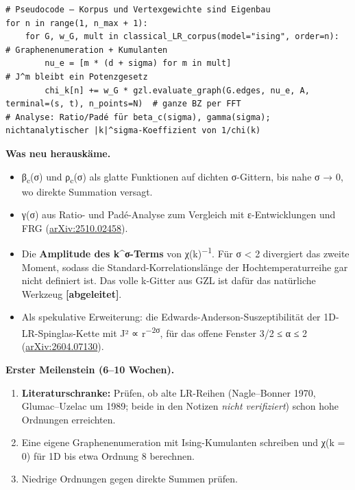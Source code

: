 \begin{verbatim}
# Pseudocode – Korpus und Vertexgewichte sind Eigenbau
for n in range(1, n_max + 1):
    for G, w_G, mult in classical_LR_corpus(model="ising", order=n):   # Graphenenumeration + Kumulanten
        nu_e = [m * (d + sigma) for m in mult]                           # J^m bleibt ein Potenzgesetz
        chi_k[n] += w_G * gzl.evaluate_graph(G.edges, nu_e, A, terminal=(s, t), n_points=N)  # ganze BZ per FFT
# Analyse: Ratio/Padé für beta_c(sigma), gamma(sigma); nichtanalytischer |k|^sigma-Koeffizient von 1/chi(k)
\end{verbatim}

\textbf{Was neu herauskäme.}

\begin{itemize}
\tightlist
\item
  β\textsubscript{c}(σ) und ρ\textsubscript{c}(σ) als glatte Funktionen auf dichten σ-Gittern, bis nahe σ → 0, wo direkte Summation versagt.
\item
  γ(σ) aus Ratio- und Padé-Analyse zum Vergleich mit ε-Entwicklungen und FRG (\href{https://arxiv.org/abs/2510.02458}{arXiv:2510.02458}).
\item
  Die \textbf{Amplitude des \textbar k\textbar\^{}σ-Terms} von χ(k)\textsuperscript{−1}. Für σ \textless{} 2 divergiert das zweite Moment, sodass die Standard-Korrelationslänge der Hochtemperaturreihe gar nicht definiert ist. Das volle k-Gitter aus GZL ist dafür das natürliche Werkzeug \textbf{{[}abgeleitet{]}}.
\item
  Als spekulative Erweiterung: die Edwards-Anderson-Suszeptibilität der 1D-LR-Spinglas-Kette mit J² ∝ r\textsuperscript{−2σ}, für das offene Fenster 3/2 ≤ α ≤ 2 (\href{https://arxiv.org/abs/2604.07130}{arXiv:2604.07130}).
\end{itemize}

\textbf{Erster Meilenstein (6--10 Wochen).}

\begin{enumerate}
\def\labelenumi{\arabic{enumi}.}
\tightlist
\item
  \textbf{Literaturschranke:} Prüfen, ob alte LR-Reihen (Nagle--Bonner 1970, Glumac--Uzelac um 1989; beide in den Notizen \emph{nicht verifiziert}) schon hohe Ordnungen erreichten.
\item
  Eine eigene Graphenenumeration mit Ising-Kumulanten schreiben und χ(k = 0) für 1D bis etwa Ordnung 8 berechnen.
\item
  Niedrige Ordnungen gegen direkte Summen prüfen.
\end{enumerate}

